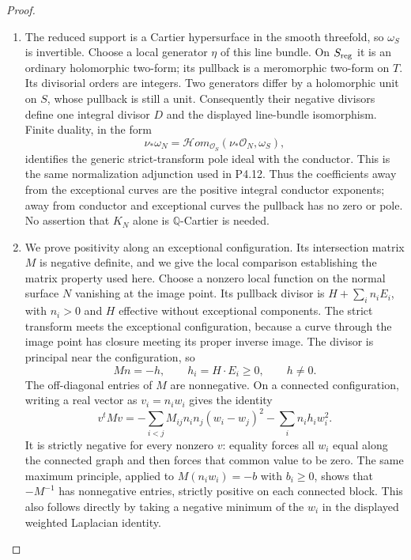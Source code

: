 \begin{proof}

\begin{enumerate}[label={$\langle1\rangle$\arabic*.},leftmargin=*]
\item The reduced support is a Cartier hypersurface in
the smooth threefold, so $\omega_S$ is invertible.
Choose a local generator $\eta$ of this line
bundle. On $S_{\rm reg}$ it is an ordinary
holomorphic two-form; its pullback is a
meromorphic two-form on $T$. Its divisorial
orders are integers. Two generators differ by
a holomorphic unit on $S$, whose pullback is
still a unit. Consequently their negative
divisors define one integral divisor $D$ and
the displayed line-bundle isomorphism.
Finite duality, in the form
\[
 \nu_*\omega_N
  =\mathcal Hom_{\mathcal O_S}
       (\nu_*\mathcal O_N,\omega_S),
\]
identifies the generic strict-transform pole
ideal with the conductor. This is the same
normalization adjunction used in P4.12. Thus
the coefficients away from the exceptional
curves are the positive integral conductor
exponents; away from conductor and exceptional
curves the pullback has no zero or pole.
No assertion that $K_N$ alone is
$\mathbb Q$-Cartier is needed.

\item We prove positivity along an exceptional
configuration. Its intersection matrix $M$
is negative definite, and we give the local
comparison establishing the matrix property
used here. Choose a nonzero local function
on the normal surface $N$ vanishing at the
image point. Its pullback divisor is
$H+\sum_i n_iE_i$, with $n_i>0$ and $H$
effective without exceptional components.
The strict transform meets the exceptional
configuration, because a curve through the
image point has closure meeting its proper
inverse image. The divisor is principal
near the configuration, so
\[
 Mn=-h,\qquad h_i=H\cdot E_i\ge0,
 \qquad h\ne0.
\]
The off-diagonal entries of $M$ are
nonnegative. On a connected configuration,
writing a real vector as $v_i=n_iw_i$
gives the identity
\[
 v^tMv
 =-\sum_{i<j}M_{ij}n_in_j(w_i-w_j)^2
   -\sum_i n_ih_iw_i^2.
\]
It is strictly negative for every nonzero
$v$: equality forces all $w_i$ equal along
the connected graph and then forces that
common value to be zero. The same maximum
principle, applied to $M(n_iw_i)=-b$ with
$b_i\ge0$, shows that $-M^{-1}$ has
nonnegative entries, strictly positive on
each connected block. This also follows
directly by taking a negative minimum of
the $w_i$ in the displayed weighted
Laplacian identity.


\end{enumerate}
\end{proof}
